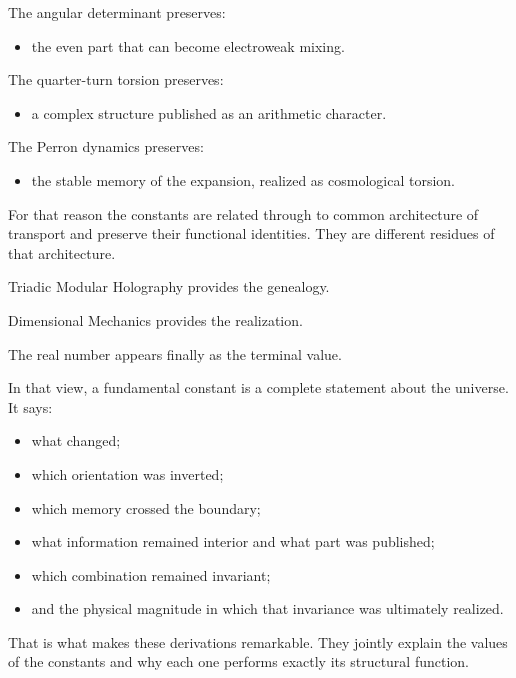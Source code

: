 The angular determinant preserves:\par

\begin{itemize}[leftmargin=*,itemsep=0.35em]
\item the even part that can become electroweak mixing.
\end{itemize}

The quarter-turn torsion preserves:\par

\begin{itemize}[leftmargin=*,itemsep=0.35em]
\item a complex structure published as an arithmetic character.
\end{itemize}

The Perron dynamics preserves:\par

\begin{itemize}[leftmargin=*,itemsep=0.35em]
\item the stable memory of the expansion, realized as cosmological torsion.
\end{itemize}

For that reason the constants are related through to common architecture of transport and preserve their functional identities. They are different residues of that architecture.\par

Triadic Modular Holography provides the genealogy.\par
Dimensional Mechanics provides the realization.\par
The real number appears finally as the terminal value.\par

In that view, a fundamental constant is a complete statement about the universe. It says:\par

\begin{itemize}[leftmargin=*,itemsep=0.35em]
\item what changed;
\item which orientation was inverted;
\item which memory crossed the boundary;
\item what information remained interior and what part was published;
\item which combination remained invariant;
\item and the physical magnitude in which that invariance was ultimately realized.
\end{itemize}

That is what makes these derivations remarkable. They jointly explain the values of the constants and why each one performs exactly its structural function.\par
